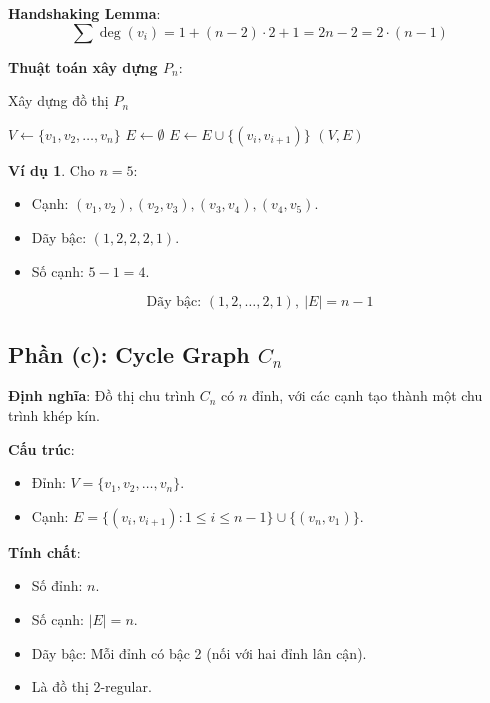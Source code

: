 \documentclass[a4paper,12pt]{article}
\theoremstyle{plain}
\theoremstyle{definition}
\newtheorem{example}{Ví dụ}
\begin{document}
\textbf{ Handshaking Lemma}:
\[
\sum \deg(v_i) = 1 + (n-2) \cdot 2 + 1 = 2n - 2 = 2 \cdot (n-1)
\]

\textbf{Thuật toán xây dựng \( P_n \)}:
\begin{algorithm}
\caption{Xây dựng đồ thị \( P_n \)}
\begin{algorithmic}
    \State $V \gets \{v_1, v_2, \ldots, v_n\}$
    \State $E \gets \emptyset$
        \State $E \gets E \cup \{(v_i, v_{i+1})\}$
    \EndFor
    \State \Return $(V, E)$
\EndFunction
\end{algorithmic}
\end{algorithm}

\begin{example}
Cho \( n=5 \):
\begin{itemize}
    \item Cạnh: \( (v_1, v_2), (v_2, v_3), (v_3, v_4), (v_4, v_5) \).
    \item Dãy bậc: \( (1, 2, 2, 2, 1) \).
    \item Số cạnh: \( 5-1 = 4 \).
\end{itemize}
\end{example}

\[
\boxed{\text{Dãy bậc: } (1, 2, \ldots, 2, 1), \ |E| = n-1}
\]

\subsection*{Phần (c): Cycle Graph \( C_n \)}

\textbf{Định nghĩa}: Đồ thị chu trình \( C_n \) có \( n \) đỉnh, với các cạnh tạo thành một chu trình khép kín.

\textbf{Cấu trúc}:
\begin{itemize}
    \item Đỉnh: \( V = \{v_1, v_2, \ldots, v_n\} \).
    \item Cạnh: \( E = \{(v_i, v_{i+1}) : 1 \leq i \leq n-1\} \cup \{(v_n, v_1)\} \).
\end{itemize}

\textbf{Tính chất}:
\begin{itemize}
    \item Số đỉnh: \( n \).
    \item Số cạnh: \( |E| = n \).
    \item Dãy bậc: Mỗi đỉnh có bậc 2 (nối với hai đỉnh lân cận).
    \item Là đồ thị 2-regular.
\end{itemize}
\end{document}
